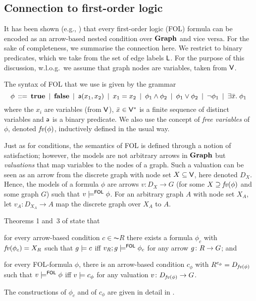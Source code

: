 \subsection{Connection to first-order logic}

It has been shown (e.g., \cite{Rensink-FOL,Habel-FOL}) that every first-order logic (FOL) formula can be encoded as an arrow-based nested condition over $\textbf{Graph}$ and vice versa. For the sake of completeness, we summarise the connection here. We restrict to binary predicates, which we take from the set of edge labels $\mathsf{L}$. For the purpose of this discussion, w.l.o.g.\ we assume that graph nodes are variables, taken from $\mathsf{V}$.

The syntax of FOL that we use is given by the grammar
%
\[ \phi \:::=\: \textbf{true}
        \:\mid\: \textbf{false}
		\:\mid\: \mathsf{a}(x_1,x_2)
        \:\mid\: x_1=x_2
		\:\mid\: \phi_1\wedge \phi_2
		\:\mid\: \phi_1\vee \phi_2
		\:\mid\: \neg\phi_1
		\:\mid\: \exists \bar x.\; \phi_1 
		\]
where the $x_i$ are variables (from $\mathsf{V}$), $\bar x\in \mathsf{V}^*$ is a finite sequence of distinct variables and $\mathsf{a}$ is a binary predicate. We also use the concept of \emph{free variables} of $\phi$, denoted $\mathit{fv}(\phi)$, inductively defined in the usual way.

Just as for conditions, the semantics of FOL is defined through a notion of satisfaction; however, the models are not arbitrary arrows in $\textbf{Graph}$ but \emph{valuations} that map variables to the nodes of a graph. Such a valuation can be seen as an arrow from the discrete graph with node set $X\subseteq \mathsf{V}$, here denoted $D_X$. Hence, the models of a formula $\phi$ are arrows $v:D_X\to G$ (for some $X\supseteq \mathit{fv}(\phi)$ and some graph $G$) such that $v\models^{\mathsf{FOL}} \phi$. For an arbitrary graph $A$ with node set $X_A$, let $v_A:D_{X_A}\to A$ map the discrete graph over $X_A$ to $A$.

Theorems 1 and~3 of \cite{Rensink-FOL} state that
\begin{enumerate*}[label=\emph{(\roman*)}]
\item for every arrow-based condition $c\in \AC R$ there exists a formula $\phi_c$ with $\mathit{fv}(\phi_c)=X_R$ such that $g\models c$ iff $v_R;g\models^{\mathsf{FOL}} \phi_c$ for any arrow $g\colon R\rightarrow G$; and

\item for every FOL-formula $\phi$, there is an arrow-based condition $c_\phi$ with $R^{c_\phi}=D_{\mathit{fv}(\phi)}$ such that $v\models^{\mathsf{FOL}} \phi$ iff $v\models c_\phi$ for any valuation $v\colon D_{\mathit{fv}(\phi)}\rightarrow G$.
\end{enumerate*}
The constructions of $\phi_c$ and of $c_\phi$ are given in detail in \cite{Rensink-FOL}.


